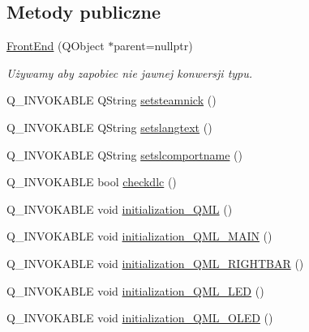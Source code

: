 \subsection*{Metody publiczne}
\begin{DoxyCompactItemize}
\item 
\mbox{\label{class_front_end_space_1_1_front_end_a34862f8e576914d06430af6b69e0bd11}} 
\hyperlink{class_front_end_space_1_1_front_end_a34862f8e576914d06430af6b69e0bd11}{Front\+End} (Q\+Object $\ast$parent=nullptr)
\begin{DoxyCompactList}\small\item\em Używamy aby zapobiec nie jawnej konwersji typu. \end{DoxyCompactList}\item 
Q\+\_\+\+I\+N\+V\+O\+K\+A\+B\+LE Q\+String \hyperlink{class_front_end_space_1_1_front_end_aff724e4666bfe62874ccb2cca78a7316}{setsteamnick} ()
\item 
Q\+\_\+\+I\+N\+V\+O\+K\+A\+B\+LE Q\+String \hyperlink{class_front_end_space_1_1_front_end_addd3e353025e289f3c4459ba31509b92}{setslangtext} ()
\item 
Q\+\_\+\+I\+N\+V\+O\+K\+A\+B\+LE Q\+String \hyperlink{class_front_end_space_1_1_front_end_a22a63f3d5d496883ff44f8cd67aa4803}{setslcomportname} ()
\item 
Q\+\_\+\+I\+N\+V\+O\+K\+A\+B\+LE bool \hyperlink{class_front_end_space_1_1_front_end_a8a5435d7eafbd875f277cc388d821fa2}{checkdlc} ()
\item 
Q\+\_\+\+I\+N\+V\+O\+K\+A\+B\+LE void \hyperlink{class_front_end_space_1_1_front_end_ac318233ef4c7e9cb4a2535c3e616b084}{initialization\+\_\+\+Q\+ML} ()
\item 
Q\+\_\+\+I\+N\+V\+O\+K\+A\+B\+LE void \hyperlink{class_front_end_space_1_1_front_end_a3297ab537801620510042bc090f57388}{initialization\+\_\+\+Q\+M\+L\+\_\+\+M\+A\+IN} ()
\item 
Q\+\_\+\+I\+N\+V\+O\+K\+A\+B\+LE void \hyperlink{class_front_end_space_1_1_front_end_ad34026be0b78307a93d7438fb0366a49}{initialization\+\_\+\+Q\+M\+L\+\_\+\+R\+I\+G\+H\+T\+B\+AR} ()
\item 
Q\+\_\+\+I\+N\+V\+O\+K\+A\+B\+LE void \hyperlink{class_front_end_space_1_1_front_end_a9d9c153b4dccf230a2a674008c89bf58}{initialization\+\_\+\+Q\+M\+L\+\_\+\+L\+ED} ()
\item 
Q\+\_\+\+I\+N\+V\+O\+K\+A\+B\+LE void \hyperlink{class_front_end_space_1_1_front_end_aab9bd39c5661dd230c540acd1c55829f}{initialization\+\_\+\+Q\+M\+L\+\_\+\+O\+L\+ED} ()
\end{DoxyCompactItemize}


